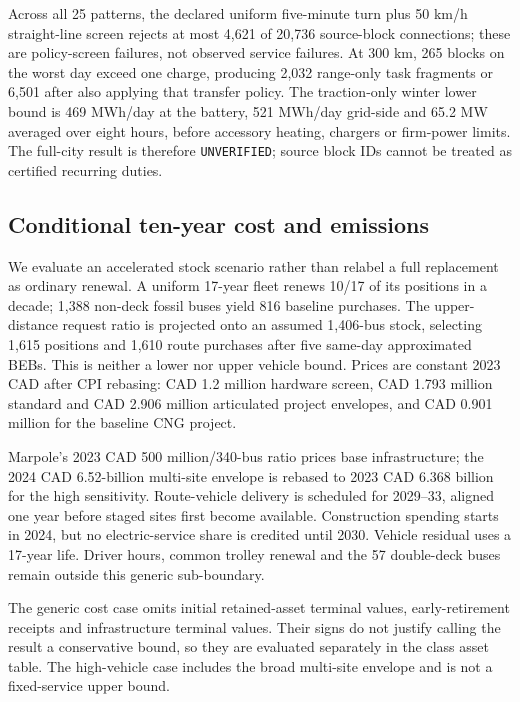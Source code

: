 \documentclass[12pt,letterpaper]{article}
\begin{document}


Across all 25 patterns, the declared uniform five-minute turn plus 50 km/h straight-line screen rejects at most 4,621 of 20,736 source-block connections; these are policy-screen failures, not observed service failures. At 300 km, 265 blocks on the worst day exceed one charge, producing 2,032 range-only task fragments or 6,501 after also applying that transfer policy. The traction-only winter lower bound is 469 MWh/day at the battery, 521 MWh/day grid-side and 65.2 MW averaged over eight hours, before accessory heating, chargers or firm-power limits. The full-city result is therefore \texttt{UNVERIFIED}; source block IDs cannot be treated as certified recurring duties.

\subsection{Conditional ten-year cost and emissions}
We evaluate an accelerated stock scenario rather than relabel a full replacement as ordinary renewal. A uniform 17-year fleet renews 10/17 of its positions in a decade; 1,388 non-deck fossil buses yield 816 baseline purchases. The upper-distance request ratio is projected onto an assumed 1,406-bus stock, selecting 1,615 positions and 1,610 route purchases after five same-day approximated BEBs. This is neither a lower nor upper vehicle bound. Prices are constant 2023 CAD after CPI rebasing: CAD 1.2 million hardware screen, CAD 1.793 million standard and CAD 2.906 million articulated project envelopes, and CAD 0.901 million for the baseline CNG project.\cite{june2023tech,budget2025,budget2024}

Marpole's 2023 CAD 500 million/340-bus ratio prices base infrastructure; the 2024 CAD 6.52-billion multi-site envelope is rebased to 2023 CAD 6.368 billion for the high sensitivity.\cite{june2023tech,playbook2024} Route-vehicle delivery is scheduled for 2029--33, aligned one year before staged sites first become available. Construction spending starts in 2024, but no electric-service share is credited until 2030. Vehicle residual uses a 17-year life. Driver hours, common trolley renewal and the 57 double-deck buses remain outside this generic sub-boundary.

The generic cost case omits initial retained-asset terminal values, early-retirement receipts and infrastructure terminal values. Their signs do not justify calling the result a conservative bound, so they are evaluated separately in the class asset table. The high-vehicle case includes the broad multi-site envelope and is not a fixed-service upper bound.
\end{document}
